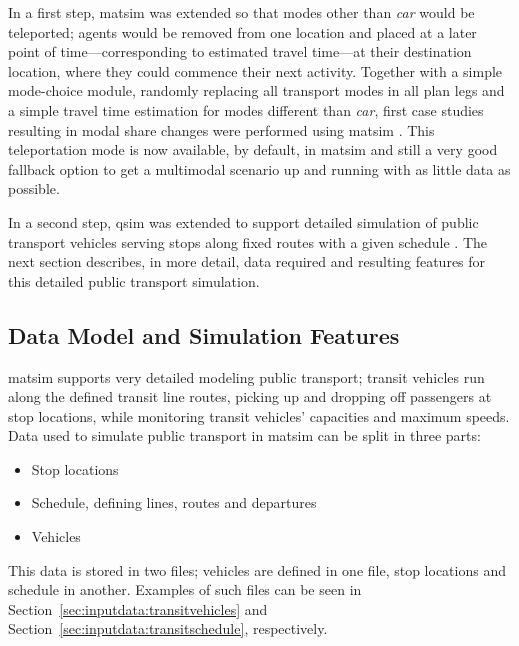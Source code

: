 In a first step, \gls{matsim} was extended so that modes other than
\emph{car} would be \gls{teleported}; agents would be removed from one location
and placed at a later point of time---corresponding to estimated travel time---at
their destination location, where they could commence their next activity.
Together with a simple mode-choice module, randomly replacing all 
transport modes in all plan legs and a simple travel time estimation for
modes different than \emph{car}, first case studies resulting in modal share
changes were performed using \gls{matsim}
\citep{RieserGretherNagel2008modeChoiceCalculations,
GretherEtAl2009SimpleModeChoiceIPL}. This \gls{teleportation} mode is now available, by
default, in \gls{matsim} and still a very good fallback option to get a \gls{multimodal} scenario
up and running with as little data as possible.

In a second step, \gls{qsim} was extended to support detailed simulation of
public transport vehicles serving stops along fixed routes with a given schedule
\citep{Rieser2010}.
The next section describes, in more detail, data required and resulting features for this
detailed public transport simulation.

\subsection{Data Model and Simulation Features}
\gls{matsim} supports very detailed modeling public transport; transit
vehicles run along the defined transit line routes, picking up
and dropping off passengers at stop locations, while monitoring transit
vehicles' capacities and maximum speeds. Data used to simulate public
transport in \gls{matsim} can be split in three parts:
%
\begin{itemize}\styleItemize
\item Stop locations
\item Schedule, defining lines, routes and departures
\item Vehicles
\end{itemize}

This data is stored in two files; vehicles are defined in one
file, stop locations and schedule in
another.
Examples of such files can be seen in
Section~\ref{sec:inputdata:transitvehicles} and
Section~\ref{sec:inputdata:transitschedule}, respectively.

